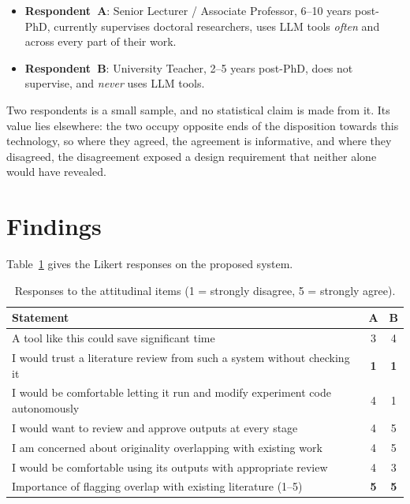 \begin{itemize}[nosep]
  \item \textbf{Respondent~A}: Senior Lecturer / Associate Professor, 6--10 years post-PhD,
        currently supervises doctoral researchers, uses LLM tools \emph{often} and across
        every part of their work.
  \item \textbf{Respondent~B}: University Teacher, 2--5 years post-PhD, does not supervise,
        and \emph{never} uses LLM tools.
\end{itemize}

Two respondents is a small sample, and no statistical claim is made from it. Its value lies
elsewhere: the two occupy opposite ends of the disposition towards this technology, so where
they agreed, the agreement is informative, and where they disagreed, the disagreement exposed
a design requirement that neither alone would have revealed.

\section{Findings}

Table~\ref{tab:ra-likert} gives the Likert responses on the proposed system.

\begin{table}[htbp]
\centering
\small
\caption{Responses to the attitudinal items (1 = strongly disagree, 5 = strongly agree).}
\label{tab:ra-likert}
\begin{tabularx}{\textwidth}{Xcc}
\toprule
\textbf{Statement} & \textbf{A} & \textbf{B} \\
\midrule
A tool like this could save significant time                              & 3 & 4 \\
I would trust a literature review from such a system without checking it  & \textbf{1} & \textbf{1} \\
I would be comfortable letting it run and modify experiment code autonomously & 4 & 1 \\
I would want to review and approve outputs at every stage                 & 4 & 5 \\
I am concerned about originality overlapping with existing work           & 4 & 5 \\
I would be comfortable using its outputs with appropriate review          & 4 & 3 \\
\midrule
Importance of flagging overlap with existing literature (1--5)            & \textbf{5} & \textbf{5} \\
\bottomrule
\end{tabularx}
\end{table}

